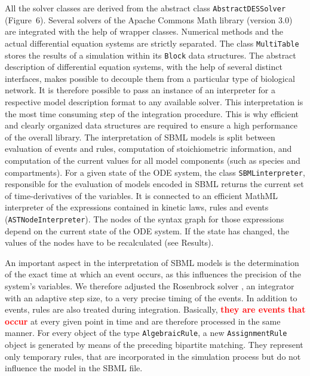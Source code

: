 \documentclass[10pt]{bmc_article}
\newenvironment{bmcformat}{\baselineskip20pt\sloppy\setboolean{publ}{false}}{\baselineskip20pt\sloppy}
\newcommand{\TODO}[1]{\textcolor{red}{\textbf{#1}}}
\newcommand{\AbstractDESSolver}{\texttt{Abstract\-DES\-Solver}}
\newcommand{\AlgebraicRule}{\texttt{Algebraic\-Rule}}
\newcommand{\AssignmentRule}{\texttt{Assignment\-Rule}}
\newcommand{\SBMLinterpreter}{\texttt{SBML\-interpreter}}
\newcommand{\MultiTable}{\texttt{Multi\-Table}}
\newcommand{\Block}{\texttt{Block}}
\newcommand{\ASTNodeInterpreter}{\texttt{ASTNode\-In\-terpreter}}
\begin{document}
\begin{bmcformat}
All the solver classes are derived from the abstract class \AbstractDESSolver{}
(Figure~6).
Several solvers of the Apache Commons Math library (version 3.0) are integrated
with the help of wrapper classes. Numerical methods and the actual differential
equation systems are strictly separated. The class \MultiTable{} stores the
results of a simulation within its \Block{} data structures. 
%
The abstract description of differential equation systems, with the help of
several distinct interfaces, makes possible to decouple them from a particular
type of biological network. It is therefore possible to pass an instance of an
interpreter for a respective model description format to any available solver.
%
This interpretation is the most time consuming step of the integration procedure.
This is why efficient and clearly organized data structures are required to
ensure a high performance of the overall library. The interpretation of SBML
models is split between evaluation of events and rules, computation of
stoichiometric information, and computation of the current values for all model
components (such as species and compartments).
%
For a given state of the ODE system, the class \SBMLinterpreter{}, responsible
for the evaluation of models encoded in SBML returns the current set of
time-derivatives of the variables.
It is connected to an efficient MathML interpreter of the expressions contained
in kinetic laws, rules and events (\ASTNodeInterpreter{}). The nodes of the syntax graph for those
expressions depend on the current state of the ODE system. If the state has
changed, the values of the nodes have to be recalculated (see Results).

%
An important aspect in the interpretation of SBML models is the
determination of the exact time at which an event occurs, as this influences
the precision of the system's variables. We therefore adjusted the Rosenbrock
solver \cite{Kotcon2011}, an integrator with an adaptive step size, to a very
precise timing of the events.
%
In addition to events, rules are also treated during integration.
Basically, \TODO{they are events that occur} at every given point in time and are therefore processed in the same manner.
For every object of the type \AlgebraicRule{}, a new \AssignmentRule{} object is generated by means of the preceding bipartite matching.
They represent only temporary rules, that are incorporated in the simulation process but do not influence the model in the SBML file.
%


\end{bmcformat}
\end{document}
